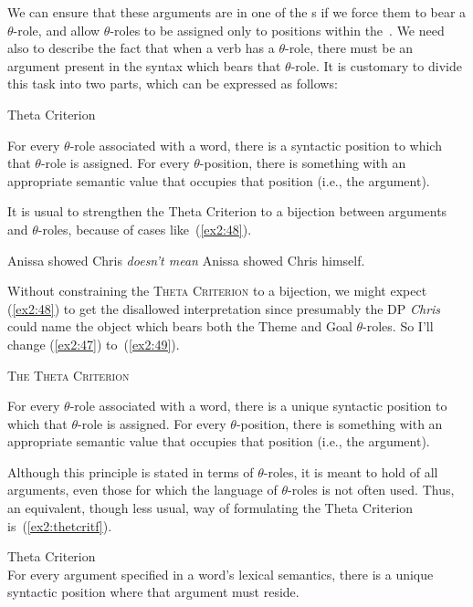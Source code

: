 We can ensure that these arguments are in one of the s if we force them to bear a  \mbox{$\theta$-role}, and allow \mbox{$\theta$-roles} to be assigned only to positions within the~. We need also to describe the fact that when a verb has a $\theta$-role, there must be an argument present in the syntax which bears that  \mbox{$\theta$-role}. It is customary to divide this task into two parts, which can be expressed as follows:
\begin{exe}
	\ex \label{ex2:47} Theta Criterion
	\begin{xlist} 
	\ex For every $\theta$-role associated with a word, there is a syntactic position to which that $\theta$-role is assigned. 
	\ex For every $\theta$-position, there is something with an appropriate semantic value that occupies that position (i.e., the argument).
	\end{xlist}
\end{exe}
It is usual to strengthen the Theta Criterion to a bijection between arguments and \mbox{$\theta$-roles}, because of cases like~(\ref{ex2:48}).
\begin{exe}
	\ex \label{ex2:48} Anissa showed Chris \emph{doesn't mean} Anissa showed Chris himself.
\end{exe}
Without constraining the \textsc{Theta Criterion} to a bijection, we might expect (\ref{ex2:48}) to get the disallowed interpretation since presumably the DP \emph{Chris} could name the object which bears both the Theme and Goal \mbox{$\theta$-roles}. So I'll change (\ref{ex2:47}) to~(\ref{ex2:49}).
\begin{exe}
	\ex \label{ex2:49} \textsc{The Theta Criterion}
	\begin{xlist} 
	\ex For every $\theta$-role associated with a word, there is a unique syntactic position to which that $\theta$-role is assigned. 
	\ex For every $\theta$-position, there is something with an appropriate semantic value that occupies that position (i.e., the argument).
	\end{xlist}
\end{exe}
Although this principle is stated in terms of $\theta$-roles, it is meant to hold of all arguments, even those for which the language of $\theta$-roles is not often used. Thus, an equivalent, though less usual, way of formulating the Theta Criterion is~(\ref{ex2:thetcritf}).
\begin{exe}
	\raggedright
	\ex \label{ex2:thetcritf} Theta Criterion\\
		For every argument specified in a word's lexical semantics, there is a unique syntactic position where that argument must reside.
\end{exe}

